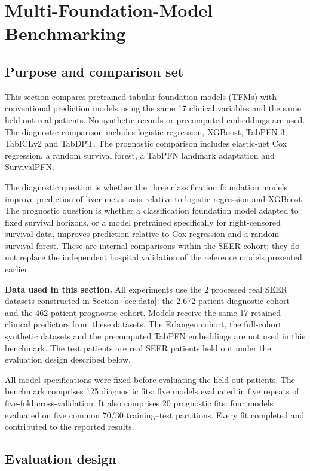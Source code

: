\section{Multi-Foundation-Model Benchmarking}
\label{sec:benchmark}

\subsection{Purpose and comparison set}

This section compares pretrained tabular foundation models (TFMs) with conventional
prediction models using the same 17 clinical variables and the same held-out
real patients.  No synthetic records or precomputed embeddings are used.  The
diagnostic comparison includes logistic regression, XGBoost, TabPFN-3,
TabICLv2 and TabDPT.  The prognostic comparison includes elastic-net Cox
regression, a random survival forest, a TabPFN landmark adaptation and
SurvivalPFN.

The diagnostic question is whether the three classification foundation models
improve prediction of liver metastasis relative to logistic regression and
XGBoost.  The prognostic question is whether a classification foundation model
adapted to fixed survival horizons, or a model pretrained specifically for
right-censored survival data, improves prediction relative to Cox regression
and a random survival forest.  These are internal comparisons within the SEER
cohort; they do not replace the independent hospital validation of the
reference models presented earlier.

\noindent\textbf{Data used in this section.} All experiments use the 2 processed
real SEER datasets constructed in Section~\ref{sec:data}: the
2,672-patient diagnostic cohort and the 462-patient prognostic cohort. Models
receive the same 17 retained clinical predictors from these datasets. The
Erlangen cohort, the full-cohort synthetic datasets and the precomputed TabPFN
embeddings are not used in this benchmark. The test patients are real SEER
patients held out under the evaluation design described below.

All model specifications were fixed before evaluating the held-out patients.
The benchmark comprises 125 diagnostic fits: five models evaluated in five
repeats of five-fold cross-validation.  It also comprises 20 prognostic fits:
four models evaluated on five common 70/30 training--test partitions.  Every
fit completed and contributed to the reported results.

\subsection{Evaluation design}
\label{sec:benchmark:design}

